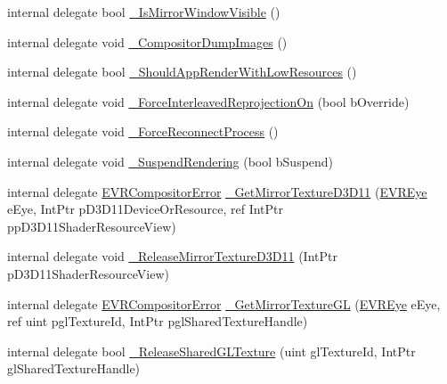\begin{DoxyCompactItemize}
\item 
internal delegate bool \mbox{\hyperlink{struct_valve_1_1_v_r_1_1_i_v_r_compositor_a709b0f249fd12044c3c24298e0794585}{\+\_\+\+Is\+Mirror\+Window\+Visible}} ()
\item 
internal delegate void \mbox{\hyperlink{struct_valve_1_1_v_r_1_1_i_v_r_compositor_a351b398aced3747ea129a949a86c5293}{\+\_\+\+Compositor\+Dump\+Images}} ()
\item 
internal delegate bool \mbox{\hyperlink{struct_valve_1_1_v_r_1_1_i_v_r_compositor_aa6f4f906ffd776b1d99a73db6224e3dd}{\+\_\+\+Should\+App\+Render\+With\+Low\+Resources}} ()
\item 
internal delegate void \mbox{\hyperlink{struct_valve_1_1_v_r_1_1_i_v_r_compositor_a36094af51a8c04b9a3e162457ce669b9}{\+\_\+\+Force\+Interleaved\+Reprojection\+On}} (bool b\+Override)
\item 
internal delegate void \mbox{\hyperlink{struct_valve_1_1_v_r_1_1_i_v_r_compositor_a41854e10b434af0c1747fdb05b91098f}{\+\_\+\+Force\+Reconnect\+Process}} ()
\item 
internal delegate void \mbox{\hyperlink{struct_valve_1_1_v_r_1_1_i_v_r_compositor_a52c4de7b702770e872b7ef001d8c6b32}{\+\_\+\+Suspend\+Rendering}} (bool b\+Suspend)
\item 
internal delegate \mbox{\hyperlink{namespace_valve_1_1_v_r_ac34ee1034fda668ccd45f57676ded81b}{E\+V\+R\+Compositor\+Error}} \mbox{\hyperlink{struct_valve_1_1_v_r_1_1_i_v_r_compositor_a9046a6da4f9d12e76f42e8476d698cc5}{\+\_\+\+Get\+Mirror\+Texture\+D3\+D11}} (\mbox{\hyperlink{namespace_valve_1_1_v_r_a8153d4a3e627e1cede046327087c1880}{E\+V\+R\+Eye}} e\+Eye, Int\+Ptr p\+D3\+D11\+Device\+Or\+Resource, ref Int\+Ptr pp\+D3\+D11\+Shader\+Resource\+View)
\item 
internal delegate void \mbox{\hyperlink{struct_valve_1_1_v_r_1_1_i_v_r_compositor_a79364707bc336637d4790df0a5949c2f}{\+\_\+\+Release\+Mirror\+Texture\+D3\+D11}} (Int\+Ptr p\+D3\+D11\+Shader\+Resource\+View)
\item 
internal delegate \mbox{\hyperlink{namespace_valve_1_1_v_r_ac34ee1034fda668ccd45f57676ded81b}{E\+V\+R\+Compositor\+Error}} \mbox{\hyperlink{struct_valve_1_1_v_r_1_1_i_v_r_compositor_a99ed37ffd770d7a7e9f1cd1c843b0f91}{\+\_\+\+Get\+Mirror\+Texture\+GL}} (\mbox{\hyperlink{namespace_valve_1_1_v_r_a8153d4a3e627e1cede046327087c1880}{E\+V\+R\+Eye}} e\+Eye, ref uint pgl\+Texture\+Id, Int\+Ptr pgl\+Shared\+Texture\+Handle)
\item 
internal delegate bool \mbox{\hyperlink{struct_valve_1_1_v_r_1_1_i_v_r_compositor_a8007bc81c8368208327b657a2d9d70b5}{\+\_\+\+Release\+Shared\+G\+L\+Texture}} (uint gl\+Texture\+Id, Int\+Ptr gl\+Shared\+Texture\+Handle)

\end{DoxyCompactItemize}

